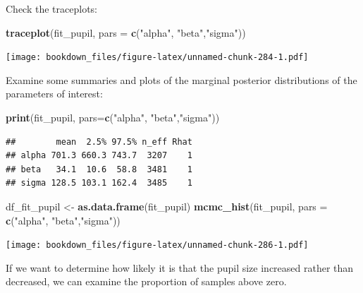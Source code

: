 \documentclass[12pt,]{krantz}
\newenvironment{Shaded}{\begin{snugshade}}{\end{snugshade}}
\newcommand{\KeywordTok}[1]{\textcolor[rgb]{0.13,0.29,0.53}{\textbf{#1}}}
\newcommand{\DataTypeTok}[1]{\textcolor[rgb]{0.13,0.29,0.53}{#1}}
\newcommand{\DecValTok}[1]{\textcolor[rgb]{0.00,0.00,0.81}{#1}}
\newcommand{\StringTok}[1]{\textcolor[rgb]{0.31,0.60,0.02}{#1}}
\newcommand{\CommentTok}[1]{\textcolor[rgb]{0.56,0.35,0.01}{\textit{#1}}}
\newcommand{\OperatorTok}[1]{\textcolor[rgb]{0.81,0.36,0.00}{\textbf{#1}}}
\newcommand{\NormalTok}[1]{#1}
\theoremstyle{definition}
\theoremstyle{definition}
\theoremstyle{definition}
\theoremstyle{remark}
\begin{document}
Check the traceplots:

\begin{Shaded}
\begin{Highlighting}[]
\KeywordTok{traceplot}\NormalTok{(fit_pupil, }\DataTypeTok{pars =} \KeywordTok{c}\NormalTok{(}\StringTok{"alpha"}\NormalTok{, }\StringTok{"beta"}\NormalTok{,}\StringTok{"sigma"}\NormalTok{))}
\end{Highlighting}
\end{Shaded}

\texttt{[image: bookdown\_files/figure-latex/unnamed-chunk-284-1.pdf]}

Examine some summaries and plots of the marginal posterior distributions
of the parameters of interest:

\begin{Shaded}
\begin{Highlighting}[]
\KeywordTok{print}\NormalTok{(fit_pupil, }\DataTypeTok{pars=}\KeywordTok{c}\NormalTok{(}\StringTok{"alpha"}\NormalTok{, }\StringTok{"beta"}\NormalTok{,}\StringTok{"sigma"}\NormalTok{))}
\end{Highlighting}
\end{Shaded}

\begin{verbatim}
##        mean  2.5% 97.5% n_eff Rhat
## alpha 701.3 660.3 743.7  3207    1
## beta   34.1  10.6  58.8  3481    1
## sigma 128.5 103.1 162.4  3485    1
\end{verbatim}

\begin{Shaded}
\begin{Highlighting}[]
\NormalTok{df_fit_pupil <-}\StringTok{ }\KeywordTok{as.data.frame}\NormalTok{(fit_pupil)}
\KeywordTok{mcmc_hist}\NormalTok{(fit_pupil, }\DataTypeTok{pars =} \KeywordTok{c}\NormalTok{(}\StringTok{"alpha"}\NormalTok{, }\StringTok{"beta"}\NormalTok{,}\StringTok{"sigma"}\NormalTok{)) }
\end{Highlighting}
\end{Shaded}

\texttt{[image: bookdown\_files/figure-latex/unnamed-chunk-286-1.pdf]}

If we want to determine how likely it is that the pupil size increased
rather than decreased, we can examine the proportion of samples above
zero.

\begin{Shaded}
\end{Shaded}
\end{document}

